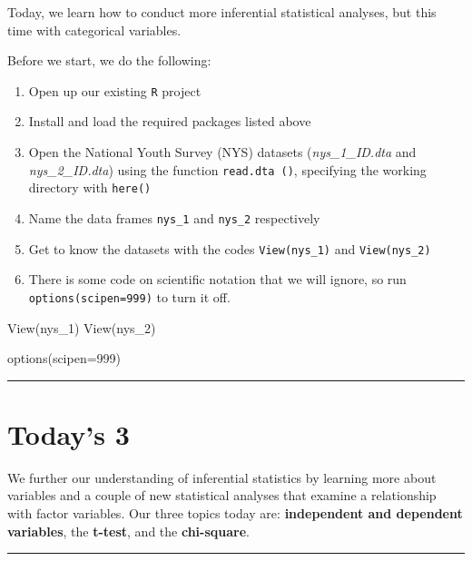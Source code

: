 \documentclass[
]{book}
\newenvironment{Shaded}{\begin{snugshade}}{\end{snugshade}}
\newcommand{\AttributeTok}[1]{\textcolor[rgb]{0.77,0.63,0.00}{#1}}
\newcommand{\DecValTok}[1]{\textcolor[rgb]{0.00,0.00,0.81}{#1}}
\newcommand{\FunctionTok}[1]{\textcolor[rgb]{0.00,0.00,0.00}{#1}}
\newcommand{\NormalTok}[1]{#1}
\begin{document}
Today, we learn how to conduct more inferential statistical analyses, but this time with categorical variables.

Before we start, we do the following:

\begin{enumerate}
\def\labelenumi{\arabic{enumi}.}
\item
  Open up our existing \texttt{R} project
\item
  Install and load the required packages listed above
\item
  Open the National Youth Survey (NYS) datasets (\emph{nys\_1\_ID.dta} and \emph{nys\_2\_ID.dta}) using the function \texttt{read.dta\ ()}, specifying the working directory with \texttt{here()}
\item
  Name the data frames \texttt{nys\_1} and \texttt{nys\_2} respectively
\item
  Get to know the datasets with the codes \texttt{View(nys\_1)} and \texttt{View(nys\_2)}
\item
  There is some code on scientific notation that we will ignore, so run \texttt{options(scipen=999)} to turn it off.
\end{enumerate}

\begin{Shaded}
\begin{Highlighting}[]
\FunctionTok{View}\NormalTok{(nys\_1)}
\FunctionTok{View}\NormalTok{(nys\_2)}

\FunctionTok{options}\NormalTok{(}\AttributeTok{scipen=}\DecValTok{999}\NormalTok{)}
\end{Highlighting}
\end{Shaded}

\begin{center}\rule{0.5\linewidth}{0.5pt}\end{center}

\hypertarget{todays-3-4}{%
\section{Today's 3}\label{todays-3-4}}

We further our understanding of inferential statistics by learning more about variables and a couple of new statistical analyses that examine a relationship with factor variables. Our three topics today are: \textbf{independent and dependent variables}, the \textbf{t-test}, and the \textbf{chi-square}.

\begin{center}\rule{0.5\linewidth}{0.5pt}\end{center}
\end{document}
